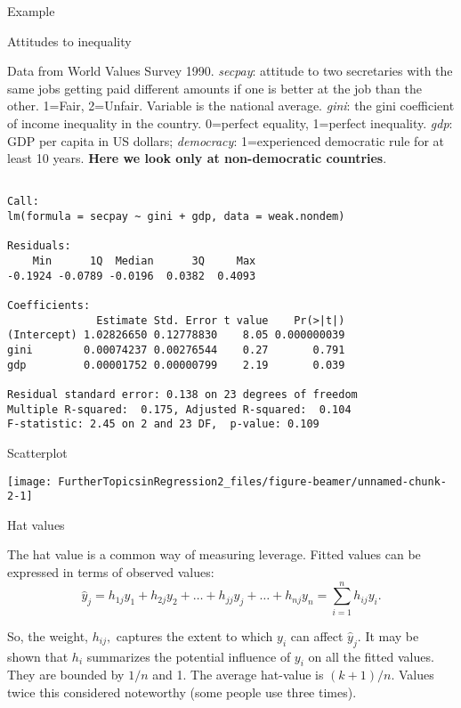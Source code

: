 \documentclass[10pt,ignorenonframetext,]{beamer}
\begin{document}
\begin{frame}[fragile]{Example}

\large
Attitudes to inequality

\footnotesize
Data from World Values Survey 1990. \emph{secpay}: attitude to two
secretaries with the same jobs getting paid different amounts if one is
better at the job than the other. 1=Fair, 2=Unfair. Variable is the
national average. \emph{gini}: the gini coefficient of income inequality
in the country. 0=perfect equality, 1=perfect inequality. \emph{gdp}:
GDP per capita in US dollars; \emph{democracy}: 1=experienced democratic
rule for at least 10 years. \textbf{Here we look only at non-democratic
countries}.

\scriptsize

\begin{verbatim}

Call:
lm(formula = secpay ~ gini + gdp, data = weak.nondem)

Residuals:
    Min      1Q  Median      3Q     Max 
-0.1924 -0.0789 -0.0196  0.0382  0.4093 

Coefficients:
              Estimate Std. Error t value    Pr(>|t|)
(Intercept) 1.02826650 0.12778830    8.05 0.000000039
gini        0.00074237 0.00276544    0.27       0.791
gdp         0.00001752 0.00000799    2.19       0.039

Residual standard error: 0.138 on 23 degrees of freedom
Multiple R-squared:  0.175, Adjusted R-squared:  0.104 
F-statistic: 2.45 on 2 and 23 DF,  p-value: 0.109
\end{verbatim}

\end{frame}

\begin{frame}{Scatterplot}

\begin{center}\texttt{[image: FurtherTopicsinRegression2\_files/figure-beamer/unnamed-chunk-2-1]} \end{center}

\end{frame}

\begin{frame}{Hat values}

The hat value is a common way of measuring leverage. Fitted values can
be expressed in terms of observed values: \[
\hat{y}_{j} = h_{1j} y_1 + h_{2j} y_2 + \dots + h_{jj} y_j + \dots + h_{nj} y_n = \sum_{i=1}^n h_{ij} y_i.
\]

So, the weight, \(h_{ij},\) captures the extent to which \(y_i\) can
affect \(\hat{y}_j.\) It may be shown that \(h_i\) summarizes the
potential influence of \(y_i\) on all the fitted values. They are
bounded by \(1/n\) and 1. The average hat-value is \((k+1)/n.\) Values
twice this considered noteworthy (some people use three times).

\end{frame}
\end{document}
